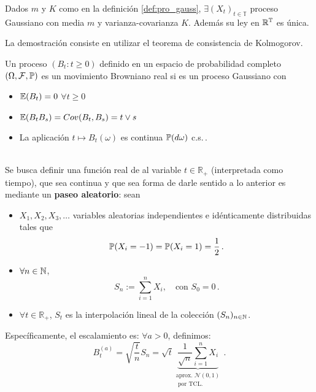 \begin{theorem}
Dados $m$ y $K$ como en la definición \ref{def:pro_gauss}, $\exists (X_t)_{t\in\mathbb{T}}$ proceso Gaussiano con media $m$ y varianza-covarianza $K$. Además su ley en $\R^{\mathbb{T}}$ es única.
\end{theorem}
La demostración consiste en utilizar el teorema de consistencia de Kolmogorov.

\begin{definition}
Un proceso $(B_t:t\geq 0)$ definido en un espacio de probabilidad completo $\edp$ es un movimiento Browniano real si es un proceso Gaussiano con
\begin{itemize}
    \item $\E(B_t)=0$ \espacio $\forall t\geq 0$
    \item $\E(B_tB_s) = Cov(B_t,B_s) = t \lor s $
    \item La aplicación $t\mapsto B_t(\omega)$ es continua $\P(d\omega)$ c.s.\,.
\end{itemize}
\end{definition}

\\
\iffalse
Se busca definir una función real de al variable $t \in \mathbb{R}_{+}$ (interpretada como tiempo), que sea continua y que sea \textit{} forma de darle sentido a lo anterior es mediante un \textbf{paseo aleatorio}: sean 
\begin{itemize}
\item $X_1, X_2, X_3, \ldots $ variables aleatorias independientes e idénticamente distribuidas tales que 
    \begin{equation*}
            \P(X_{i} = -1) = \P(X_i = 1) = \frac{1}{2}\,.
    \end{equation*}
 \item $\forall  n \in \N$,
     \begin{equation*}
             S_n := \sum_{i=1}^{n} X_i, ~ ~ ~ \text{ con } S_0 = 0\,.
     \end{equation*}
 \item $\forall t\in \mathbb{R}_{+}$, $S_t$ es la interpolación lineal de la colección $(S_{n})_{n \in \N}$.
\end{itemize}

Específicamente, el escalamiento es: $\forall a >0$, definimos:
\begin{equation*}
    B_t^{(a)} = \sqrt{\frac{t}{n}}   S_n = \sqrt{t}
    \underbrace{\frac{1}{\sqrt{n} } \sum_{i=1}^{n} X_i}_{\substack{\text{aprox. } \mathcal{N}(0,1) \\ \text{ por TCL.}}}\,.
\end{equation*}

